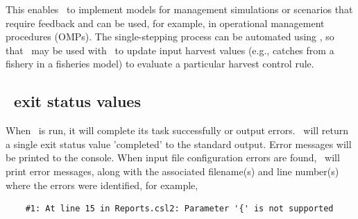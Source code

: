 This enables \CNAME~to implement models for management simulations or scenarios that require feedback and can be used, for example, in operational management procedures (OMPs). The single-stepping process can be automated using \R, so that \CNAME~may be used with \R\ to update input harvest values (e.g., catches from a fishery in a fisheries model) to evaluate a particular harvest control rule.

\subsection{\CNAME~exit status values}

When \CNAME~is run, it will complete its task successfully or output errors. \CNAME~will return a single exit status value 'completed' to the standard output. Error messages will be printed to the console. When input file configuration errors are found, \CNAME~will print error messages, along with the associated filename(s) and line number(s) where the errors were identified, for example,

{\small{\begin{verbatim}
	#1: At line 15 in Reports.csl2: Parameter '{' is not supported
\end{verbatim}}}
